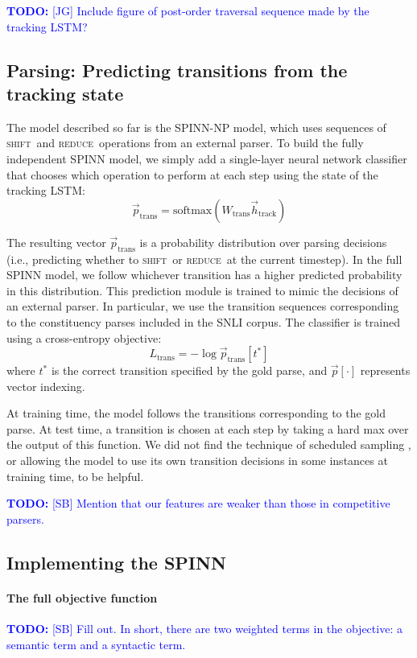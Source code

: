 \documentclass[11pt]{article}
\newcommand\todo[1]{\textcolor{blue}{\textbf{TODO:} #1}}
\newcommand{\shift}{\textsc{shift}}
\newcommand{\reduce}{\textsc{reduce}}
\begin{document}
\todo{[JG] Include figure of post-order traversal sequence made by the tracking LSTM?}

\subsection{Parsing: Predicting transitions from the tracking state}

The model described so far is the SPINN-NP model, which uses sequences of \shift~and \reduce~operations from an external parser. To build the fully independent SPINN model, we simply add a single-layer neural network classifier that chooses which operation to perform at each step using the state of the tracking LSTM:
\begin{equation}
\vec{p}_{\text{trans}} = \text{softmax}(W_{\text{trans}}\vec{h}_{\text{track}})
\end{equation}

The resulting vector $\vec{p}_{\text{trans}}$ is a probability distribution over parsing decisions (i.e., predicting whether to \shift~or \reduce~at the current timestep). In the full SPINN model, we follow whichever transition has a higher predicted probability in this distribution. This prediction module is trained to mimic the decisions of an external parser. In particular, we use the transition sequences corresponding to the constituency parses included in the SNLI corpus. The classifier is trained using a cross-entropy objective:
\begin{equation}
  L_{\text{trans}} = - \log \vec{p}_{\text{trans}}[t^*]
\end{equation}
where $t^*$ is the correct transition specified by the gold parse, and $\vec{p}[\cdot]$ represents vector indexing.

At training time, the model follows the transitions corresponding to the gold parse. At test time, a transition is chosen at each step by taking a hard max over the output of this function. We did not find the technique of scheduled sampling \citep{bengio2015scheduled}, or allowing the model to use its own transition decisions in some instances at training time, to be helpful.

\todo{[SB] Mention that our features are weaker than those in competitive parsers.}

\subsection{Implementing the SPINN}

\paragraph{The full objective function} \todo{[SB] Fill out. In short, there are two weighted terms in the objective: a semantic term and a syntactic term.}
\end{document}
